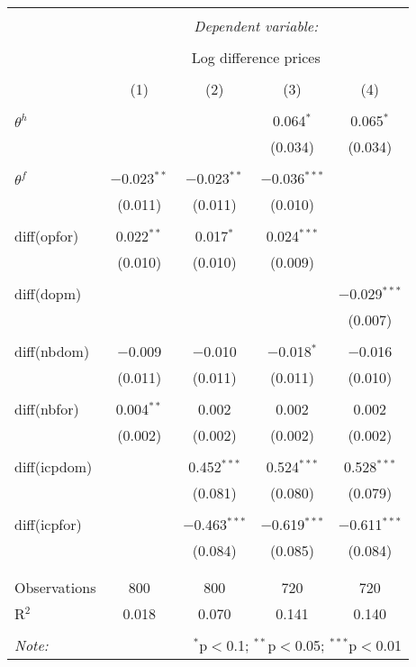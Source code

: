 
\begin{tabular}{@{\extracolsep{5pt}}lcccc} 
\\[-1.8ex]\hline 
\hline \\[-1.8ex] 
 & \multicolumn{4}{c}{\textit{Dependent variable:}} \\ 
\cline{2-5} 
\\[-1.8ex] & \multicolumn{4}{c}{Log difference prices} \\ 
\\[-1.8ex] & (1) & (2) & (3) & (4)\\ 
\hline \\[-1.8ex] 
 $\theta^h$ &  &  & 0.064$^{*}$ & 0.065$^{*}$ \\ 
  &  &  & (0.034) & (0.034) \\ 
  & & & & \\ 
 $\theta^f$ & $-$0.023$^{**}$ & $-$0.023$^{**}$ & $-$0.036$^{***}$ &  \\ 
  & (0.011) & (0.011) & (0.010) &  \\ 
  & & & & \\ 
 diff(opfor) & 0.022$^{**}$ & 0.017$^{*}$ & 0.024$^{***}$ &  \\ 
  & (0.010) & (0.010) & (0.009) &  \\ 
  & & & & \\ 
 diff(dopm) &  &  &  & $-$0.029$^{***}$ \\ 
  &  &  &  & (0.007) \\ 
  & & & & \\ 
 diff(nbdom) & $-$0.009 & $-$0.010 & $-$0.018$^{*}$ & $-$0.016 \\ 
  & (0.011) & (0.011) & (0.011) & (0.010) \\ 
  & & & & \\ 
 diff(nbfor) & 0.004$^{**}$ & 0.002 & 0.002 & 0.002 \\ 
  & (0.002) & (0.002) & (0.002) & (0.002) \\ 
  & & & & \\ 
 diff(icpdom) &  & 0.452$^{***}$ & 0.524$^{***}$ & 0.528$^{***}$ \\ 
  &  & (0.081) & (0.080) & (0.079) \\ 
  & & & & \\ 
 diff(icpfor) &  & $-$0.463$^{***}$ & $-$0.619$^{***}$ & $-$0.611$^{***}$ \\ 
  &  & (0.084) & (0.085) & (0.084) \\ 
  & & & & \\ 
\hline \\[-1.8ex] 
Observations & 800 & 800 & 720 & 720 \\ 
R$^{2}$ & 0.018 & 0.070 & 0.141 & 0.140 \\ 
\hline 
\hline \\[-1.8ex] 
\textit{Note:}  & \multicolumn{4}{r}{$^{*}$p$<$0.1; $^{**}$p$<$0.05; $^{***}$p$<$0.01} \\ 
\end{tabular} 
